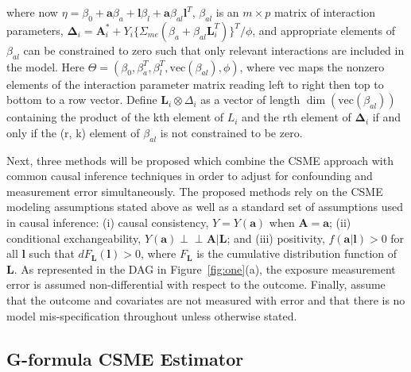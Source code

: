 \documentclass[useAMS,usenatbib,referee]{biom}
\begin{document}
where now $\eta = \beta_{0} + \bm{a}\beta_{a} + \bm{l}\beta_{l} + \bm{a}\beta_{al}\bm{l}^{T}$, $\beta_{al}$ is an $m \times p$ matrix of interaction parameters, $\bm{\Delta}_{i} = \bm{A}_{i}^{*} + Y_{i}\{ \Sigma_{me}(\beta_{a} + \beta_{al}\bm{L}_{i}^{T}) \}^{T}/\phi$, and appropriate elements of $\beta_{al}$ can be constrained to zero such that only relevant interactions are included in the model. Here $\Theta = (\beta_{0}, \beta^{T}_{a}, \beta^{T}_{l}, \text{vec}(\beta_{al}), \phi)$, where $\text{vec}$ maps the nonzero elements of the interaction parameter matrix reading left to right then top to bottom to a row vector. Define $\bm{L}_{i} \otimes \Delta_{i}$ as a vector of length $\dim(\text{vec}(\beta_{al}))$ containing the product of the kth element of $L_{i}$ and the rth element of $\bm{\Delta}_{i}$ if and only if the (r, k) element of $\beta_{al}$ is not constrained to be zero.

Next, three methods will be proposed which combine the CSME approach with common causal inference techniques in order to adjust for confounding and measurement error simultaneously. The proposed methods rely on the CSME modeling assumptions stated above as well as a standard set of assumptions used in causal inference: (i) causal consistency, $Y = Y(\bm{a})$ when $\bm{A} = \bm{a}$; (ii) conditional exchangeability, $Y(\bm{a}) \perp \!\!\! \perp \bm{A} | \bm{L}$; and (iii) positivity, $f(\bm{a} | \bm{l}) > 0$ for all $\bm{l}$ such that $dF_{\bm{L}}(\bm{l}) > 0$, where $F_{\bm{L}}$ is the cumulative distribution function of $\bm{L}$. As represented in the DAG in Figure~\ref{fig:one}(a), the exposure measurement error is assumed non-differential with respect to the outcome. Finally, assume that the outcome and covariates are not measured with error and that there is no model mis-specification throughout unless otherwise stated.

\subsection{G-formula CSME Estimator}
\end{document}
